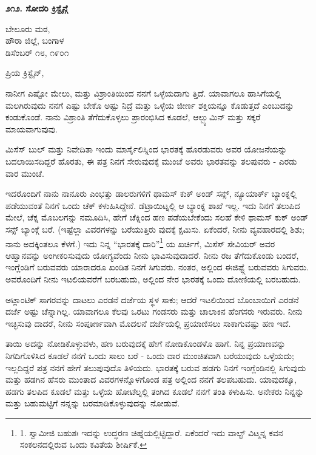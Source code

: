 \begin{center}
\textbf{೨೧೨. ಸೋದರಿ ಕ್ರಿಸ್ಟೈನ್ಗೆ}
\end{center}

\begin{flushright}
ಬೇಲೂರು ಮಠ,\\ಹೌರಾ ಜಿಲ್ಲೆ, ಬಂಗಾಳ\\ಡಿಸೆಂಬರ್ ೧೮, ೧೯೦೧
\end{flushright}

ಪ್ರಿಯ ಕ್ರಿಸ್ಟೈನ್,

ನಾನೀಗ ಎಷ್ಟೋ ಮೇಲು, ಮತ್ತು ವಿಶ್ರಾಂತಿಯಿಂದ ನನಗೆ ಒಳ್ಳೆಯದಾಗು ತ್ತಿದೆ. ಯಾವಾಗಲೂ ಹಾಸಿಗೆಯಲ್ಲಿ ಮಲಗಿರುವುದು ನನಗೆ ಎಷ್ಟು ಬೇಕೊ ಅಷ್ಟು ನಿದ್ರೆ ಮತ್ತು ಒಳ್ಳೆಯ ಜೀರ್ಣ ಶಕ್ತಿಯನ್ನೂ ಕೊಡುತ್ತದೆ ಎಂಬುದನ್ನು ಕಂಡುಕೊಂಡೆ. ನಾನು ವಿಶ್ರಾಂತಿ ತೆಗೆದುಕೊಳ್ಳಲು ಪ್ರಾರಂಭಿಸಿದ ಕೂಡಲೆ, ಆಲ್ಬ್ಯುಮಿನ್ ಮತ್ತು ಸಕ್ಕರೆ ಮಾಯವಾಗುವುವು.

ಮಿಸೆಸ್ ಬುಲ್ ಮತ್ತು ನಿವೇದಿತಾ ಇಂದು ಮಾರ್ಸೈಲಿಸ್ನಿಂದ ಭಾರತಕ್ಕೆ ಹೊರಡುವರು ಅವರ ಯೋಜನೆಯನ್ನು ಬದಲಾಯಿಸದಿದ್ದರೆ ಹೊರತು, ಈ ಪತ್ರ ನಿನಗೆ ಸೇರುವುದಕ್ಕೆ ಮುಂಚೆ ಅವರು ಭಾರತವನ್ನು ತಲಪುವರು - ಎರಡು ವಾರ ಮುಂಚೆ.

ಇದರೊಂದಿಗೆ ನಾನು ನಾನೂರು ಎಂಭತ್ತು ಡಾಲರುಗಳಿಗೆ ಥಾಮಸ್ ಕುಕ್ ಅಂಡ್ ಸನ್ಸ್, ನ್ಯೂಯಾರ್ಕ್ ಬ್ಯಾಂಕ್ನಲ್ಲಿ ಪಡೆಯುವಂತೆ ನಿನಗೆ ಒಂದು ಚೆಕ್ ಕಳುಹಿಸಿದ್ದೇನೆ. ಡೆಟ್ರಾಯಿಟ್ನಲ್ಲಿ ಆ ಬ್ಯಾಂಕ್ನ ಶಾಖೆ ಇಲ್ಲ. ಇದು ನಿನಗೆ ತಲುಪಿದ ಮೇಲೆ, ಚೆಕ್ನ ಮೊಬಲಗನ್ನು ನಮೂದಿಸಿ, ಹೇಗೆ ಚೆಕ್ನಿಂದ ಹಣ ಪಡೆಯಬೇಕೆಂದು ಸಲಹೆ ಕೇಳಿ ಥಾಮಸ್ ಕುಕ್ ಅಂಡ್ ಸನ್ಸ್ ಬ್ಯಾಂಕ್ಗೆ ಬರೆ. (ಇಷ್ಟೆಲ್ಲಾ ವಿವರಗಳನ್ನು ಬರೆಯುತ್ತಿರು ವುದಕ್ಕೆ ಕ್ಷಮಿಸು. ಏಕೆಂದರೆ, ನೀನು ವ್ಯವಹಾರದಲ್ಲಿ ಶಿಶು; ನಾನು ಅದಕ್ಕಿಂತಲೂ ಕೆಳಗೆ.) ಇದು ನಿನ್ನ “ಭಾರತಕ್ಕೆ ದಾರಿ”\footnote{1. ಸ್ವಾಮೀಜಿ ಬಹುಶಃ ಇದನ್ನು ಉದ್ಧರಣ ಚಿಹ್ನೆಯಲ್ಲಿಟ್ಟಿದ್ದಾರೆ. ಏಕೆಂದರೆ ಇದು ವಾಲ್ಟ್ ವಿಟ್ಮನ್ನ  ಕವನ ಸಂಕಲನದಲ್ಲಿರುವ ಒಂದು ಕವಿತೆಯ ಶೀರ್ಷಿಕೆ.} ಯ ಖರ್ಚಿಗೆ, ಮಿಸೆಸ್ ಸೇವಿಯರ್ ಅವರ ಆಹ್ವಾನವನ್ನು ಅಂಗೀಕರಿಸುವುದು ಯೋಗ್ಯವೆಂದು ನೀನು ಭಾವಿಸುವುದಾದರೆ. ನೀನು ರಜ ತೆಗೆದುಕೊಂಡು ಬಂದರೆ, ಇಂಗ್ಲೆಂಡಿಗೆ ಬರುವವರು ಯಾರಾದರೂ ಖಂಡಿತ ನಿನಗೆ ಸಿಗುವರು. ನಂತರ, ಅಲ್ಲಿಂದ ಈಜಿಪ್ಟ್ಗೆ ಬರುವವರು ಸಿಗುವರು. ಅವರೊಂದಿಗೆ ನೀನು ಇಟಲಿಯವರೆಗೆ ಬರಬಹುದು, ಅಲ್ಲಿಂದ ನೇರ ಭಾರತಕ್ಕೆ ಒಂದು ದೋಣಿಯಲ್ಲಿ ಬರಬಹುದು.

ಅಟ್ಲಾಂಟಿಕ್ ಸಾಗರವನ್ನು ದಾಟಲು ಎರಡನೆ ದರ್ಜೆಯ ಸ್ಥಳ ಸಾಕು; ಆದರೆ ಇಟಲಿಯಿಂದ ಬೊಂಬಾಯಿಗೆ ಎರಡನೆ ದರ್ಜೆ ಅಷ್ಟು ಚೆನ್ನಾಗಿಲ್ಲ. ಯಾವಾಗಲೂ ಕೆಲವು ಒರಟು ಗಂಡಸರು ಮತ್ತು ಚಾಲಾಕಿನ ಹೆಂಗಸರು ಇರುವರು. ನೀನು ಇಚ್ಛಿಸುವು ದಾದರೆ, ನೀನು ಸಂಪೂರ್ಣವಾಗಿ ಮೊದಲನೆ ದರ್ಜೆಯಲ್ಲಿ ಪ್ರಯಾಣಿಸಲು ಸಾಕಾಗುವಷ್ಟು ಹಣ ಇದೆ.

ತಾಯಿ ಅದನ್ನು ನೋಡಿಕೊಳ್ಳುವಳು, ಹಣ ಬರುವುದಕ್ಕೆ ಹೇಗೆ ನೋಡಿಕೊಂಡಳೊ ಹಾಗೆ. ನಿನ್ನ ಪ್ರಯಾಣವನ್ನು ನಿಗದಿಗೊಳಿಸಿದ ಕೂಡಲೆ ನನಗೆ ಒಂದು ಸಾಲು ಬರೆ - ಒಂದು ವಾರ ಮುಂಚಿತವಾಗಿ ಬರೆಯುವುದು ಒಳ್ಳೆಯದು; ಇಲ್ಲದಿದ್ದರೆ ಪತ್ರ ನನಗೆ ಹೇಗೆ ತಲುಪುವುದೊ ತಿಳಿಯದು. ಭಾರತಕ್ಕೆ ಬರುವ ಹಡಗು ನಿನಗೆ ಇಂಗ್ಲೆಂಡಿನಲ್ಲಿ ಸಿಗುವುದು ಮತ್ತು ಹಡಗಿನ ಹೆಸರು ಮುಂತಾದ ವಿವರಗಳನ್ನೊಳಗೊಂಡ ಪತ್ರ ಅಲ್ಲಿಂದ ನನಗೆ ತಲಪಬಹುದು. ಯಾವುದಕ್ಕೂ, ಹಡಗು ತಲಪಿದ ಕೂಡಲೆ ಮತ್ತು ಒಳ್ಳೆಯ ಹೋಟೆಲ್ನಲ್ಲಿ ತಂಗಿದ ಕೂಡಲೆ ನನಗೆ ತಂತಿ ಕಳುಹಿಸು. ಅನೇಕರು ನಿನ್ನನ್ನು ಮತ್ತು ಬಹುಮಟ್ಟಿಗೆ ನನ್ನನ್ನು ಬರಮಾಡಿಕೊಳ್ಳುವುದನ್ನು ನೋಡುವೆ.

